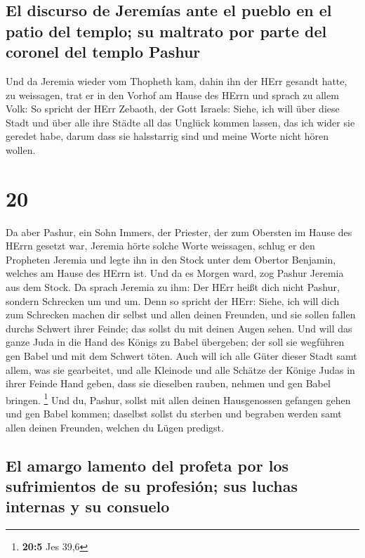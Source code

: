 \hypertarget{el-discurso-de-jeremuxedas-ante-el-pueblo-en-el-patio-del-templo-su-maltrato-por-parte-del-coronel-del-templo-pashur}{%
\subsection{El discurso de Jeremías ante el pueblo en el patio del
templo; su maltrato por parte del coronel del templo
Pashur}\label{el-discurso-de-jeremuxedas-ante-el-pueblo-en-el-patio-del-templo-su-maltrato-por-parte-del-coronel-del-templo-pashur}}

 Und da Jeremia wieder vom Thopheth kam, dahin ihn der
HErr gesandt hatte, zu weissagen, trat er in den Vorhof am Hause des
HErrn und sprach zu allem Volk:  So spricht der HErr
Zebaoth, der Gott Israels: Siehe, ich will über diese Stadt und über
alle ihre Städte all das Unglück kommen lassen, das ich wider sie
geredet habe, darum dass sie halsstarrig sind und meine Worte nicht
hören wollen.

\hypertarget{section-19}{%
\section{20}\label{section-19}}

 Da aber Pashur, ein Sohn Immers, der Priester, der zum
Obersten im Hause des HErrn gesetzt war, Jeremia hörte solche Worte
weissagen,  schlug er den Propheten Jeremia und legte ihn
in den Stock unter dem Obertor Benjamin, welches am Hause des HErrn ist.
 Und da es Morgen ward, zog Pashur Jeremia aus dem Stock.
Da sprach Jeremia zu ihm: Der HErr heißt dich nicht Pashur, sondern
Schrecken um und um.  Denn so spricht der HErr: Siehe, ich
will dich zum Schrecken machen dir selbst und allen deinen Freunden, und
sie sollen fallen durchs Schwert ihrer Feinde; das sollst du mit deinen
Augen sehen. Und will das ganze Juda in die Hand des Königs zu Babel
übergeben; der soll sie wegführen gen Babel und mit dem Schwert töten.
 Auch will ich alle Güter dieser Stadt samt allem, was sie
gearbeitet, und alle Kleinode und alle Schätze der Könige Judas in ihrer
Feinde Hand geben, dass sie dieselben rauben, nehmen und gen Babel
bringen. \footnote{\textbf{20:5} Jes 39,6}  Und du,
Pashur, sollst mit allen deinen Hausgenossen gefangen gehen und gen
Babel kommen; daselbst sollst du sterben und begraben werden samt allen
deinen Freunden, welchen du Lügen predigst.

\hypertarget{el-amargo-lamento-del-profeta-por-los-sufrimientos-de-su-profesiuxf3n-sus-luchas-internas-y-su-consuelo}{%
\subsection{El amargo lamento del profeta por los sufrimientos de su
profesión; sus luchas internas y su
consuelo}\label{el-amargo-lamento-del-profeta-por-los-sufrimientos-de-su-profesiuxf3n-sus-luchas-internas-y-su-consuelo}}

